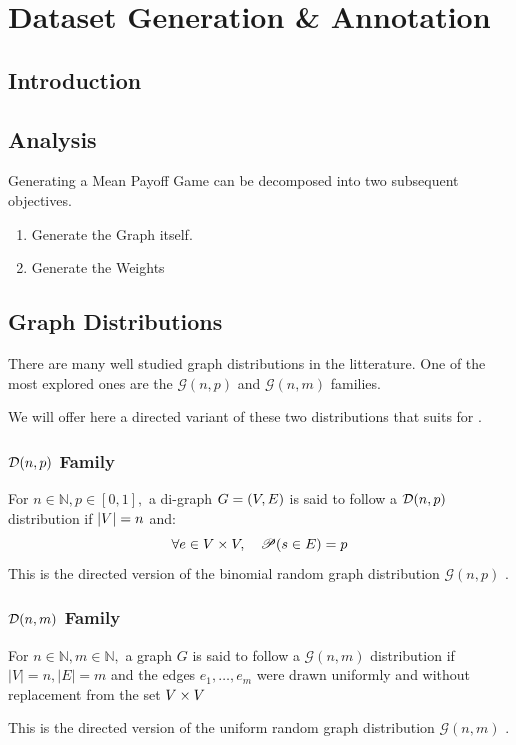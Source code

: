 \chapter{Dataset Generation \& Annotation}
\label{section:Dataset}

\section{Introduction}
\section{Analysis}
Generating a Mean Payoff Game can be decomposed into two subsequent objectives.
\begin{enumerate}
	\item Generate the Graph itself.
	\item Generate the Weights
\end{enumerate}


\section{Graph Distributions}
There are many well studied graph distributions in the litterature. One of the most explored ones are the $\mathcal{G}(n,p)$ and $\mathcal{G}(n,m)$ families.

We will offer here a directed variant of these two distributions that suits for .
\subsection{$\mathcal{D}(n,p)$ Family}
For $n\in\mathbb{N},p\in[0,1],$ a di-graph $G=(V,E)$ is said to follow a $\mathcal{D}(n,p)$ distribution if $\lvert V \rvert=n$ and:
$$
\forall e\in V\times V, \quad \mathscr{P}(s\in E)=p
$$
This is the directed version of the binomial random graph distribution $\mathcal{G}(n,p)$ \cite[Section.~1.1]{RandomGraphs}.

\subsection{$\mathcal{D}(n,m)$ Family}
For $n\in\mathbb{N},m\in\mathbb{N},$ a graph $G$ is said to follow a $\mathcal{G}(n,m)$ distribution if $\lvert V \rvert=n,\lvert  E \rvert=m$ and the edges $e_1,\dots,e_m$ were drawn uniformly and without replacement from the set $V\times V$

This is the directed version of the uniform random graph distribution $\mathcal{G}(n,m)$ \cite[Section.~1.1]{RandomGraphs}.

